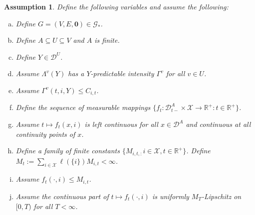 \documentclass[12pt]{article}
\newcommand{\mb}{\mathbb}
\newcommand{\mc}{\mathcal}
\newcommand{\ra}{\rightarrow}
\newcommand{\tr}{\textcolor{red}}
\newcommand{\defeq}{:=}								%
\newcommand{\cad}{\mc{D}}							%
\newcommand{\sta}{\mc{X}}							%
\renewcommand{\root}{\mathbf{0}}					%
\newcommand{\Sm}{\ell}								%
\newcommand{\xf}{x}									%
\newcommand{\vind}[1]{_{#1}}						%
\newcommand{\vpara}[1]{^{#1}}						%
\newcommand{\tpara}[1]{_{#1}}						%
\newcommand{\jumpibd}[2]{C_{#1,#2}}					%
\newcommand{\Gs}{\mc{G}_\ast}						%
\newcommand{\tmepro}[3]{
\ifstrempty{#3}{
	\left(#1,#2\right)}{
	\left(#1,#2,#3\right)}}							%
\newcommand{\Xg}{Y}									%
\newcommand{\pmap}{\Lambda}							%
\newcommand{\ratee}{\Gamma}							%
\newcommand{\const}{M}								%
\newcommand{\sttpara}[2]{_{#1,#2}}					%
\newcommand{\tmestpro}[3]{\left(#1,#2,#3\right)}	%
\newtheorem{assu}{Assumption}
\begin{document}
\begin{assu}
Define the following variables and assume the following:

\begin{enumerate}[(a)]
\item Define \(G = (V,E,\root) \in \Gs\).

\item Define \(A \subseteq U\subseteq V\) and \(A\) is finite.

\item Define \(\Xg \in \cad\vpara{U}\).

\item Assume \(\pmap\vpara{v}(\Xg)\) has a \(\Xg\)-predictable intensity \(\ratee\vpara{v}\) for all \(v \in U\).

\item Assume \(\ratee\vpara{v}\tmestpro{t}{i}{\Xg} \leq \jumpibd{i}{t}\).

\item Define the sequence of measurable mappings \(\{f_t: \cad\vpara{A}\tpara{t-}\times \sta \ra\mb{R}^+:t \in \mb{R}^+\}\).

\item Assume \(t \mapsto f_t(\xf,i)\) is left continuous for all \(\xf \in \cad\vpara{A}\) and continuous at all continuity points of \(\xf\).

\item Define a family of finite constants \(\{\const\sttpara{i,t}: i \in \sta,t\in \mb{R}^+\}\). Define \(\const\tpara{t} \defeq \sum_{i\in\sta}\Sm(\{i\})\const\sttpara{i}{t} < \infty\).

\item Assume \(f_t(\cdot,i) \leq \const\sttpara{i}{t}\).

\item Assume the continuous part of \(t \mapsto f_t(\cdot,i)\) is uniformly \(\const\tpara{T}\)-Lipschitz on \([0,T)\) for all \(T < \infty\).
\end{enumerate}
%
%
\label{Ex::Eassu}
\end{assu}
\end{document}
